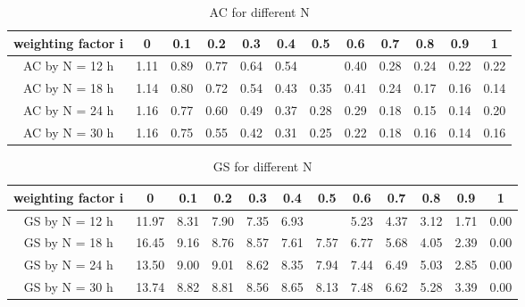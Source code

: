     \begin{table}[H]
    \centering
    \begin{tabular}{c|c|c|c|c|c|c|c|c|c|c|c}
         weighting factor i&0&0.1&0.2&0.3&0.4&0.5&0.6&0.7&0.8&0.9&1  \\
         \hline
         AC by N = 12 h& 1.11 & 0.89 & 0.77 & 0.64 & 0.54 &  & 0.40 & 0.28 & 0.24 & 0.22 & 0.22\\
         AC by N = 18 h& 1.14 & 0.80 & 0.72 & 0.54 & 0.43 & 0.35 & 0.41 & 0.24 & 0.17 & 0.16 & 0.14\\
         AC by N = 24 h&  1.16 & 0.77 & 0.60 & 0.49 & 0.37 & 0.28 & 0.29 & 0.18 & 0.15 & 0.14 & 0.20\\
         AC by N = 30 h& 1.16 & 0.75 & 0.55 & 0.42 & 0.31 & 0.25 & 0.22 & 0.18 & 0.16 & 0.14 & 0.16\\
    \end{tabular}
    \caption{AC for different N}
    \label{tab:AC for different N}
    \end{table}
    
    \begin{table}[H]
    \centering
    \begin{tabular}{c|c|c|c|c|c|c|c|c|c|c|c}
         weighting factor i&0&0.1&0.2&0.3&0.4&0.5&0.6&0.7&0.8&0.9&1  \\
         \hline
         GS by N = 12 h& 11.97 & 8.31 & 7.90 & 7.35 & 6.93 &  & 5.23 & 4.37 & 3.12 & 1.71 & 0.00\\
         GS by N = 18 h & 16.45 & 9.16 & 8.76 & 8.57 & 7.61 & 7.57 & 6.77 & 5.68 & 4.05 & 2.39 & 0.00\\
         GS by N = 24 h & 13.50 & 9.00 & 9.01 & 8.62 & 8.35 & 7.94 & 7.44 & 6.49 & 5.03 & 2.85 & 0.00\\
         GS by N = 30 h & 13.74 & 8.82 & 8.81 & 8.56 & 8.65 & 8.13 & 7.48 & 6.62 & 5.28 & 3.39 & 0.00\\
    \end{tabular}
    \caption{GS for different N}
    \label{tab:GS for different N}
\end{table}
    
